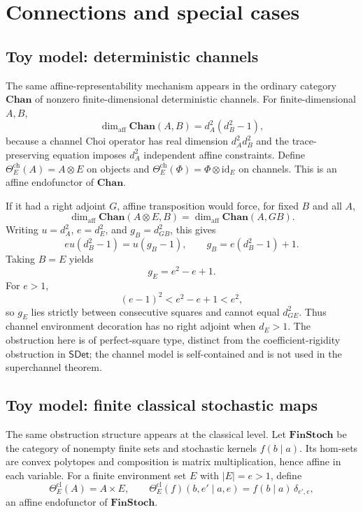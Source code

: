 \documentclass[11pt,a4paper]{article}
\theoremstyle{definition}
\theoremstyle{plain}
\theoremstyle{remark}
\newcommand{\affdim}{\dim_{\mathrm{aff}}}
\newcommand{\id}{\mathrm{id}}
\newcommand{\SDet}{\mathsf{SDet}}
\begin{document}
\section{Connections and special cases}

\subsection{Toy model: deterministic channels}

The same affine-representability mechanism appears in the ordinary
category $\mathbf{Chan}$ of nonzero finite-dimensional deterministic
channels. For finite-dimensional $A,B$,
\[
\affdim\mathbf{Chan}(A,B)=d_A^2(d_B^2-1),
\]
because a channel Choi operator has real dimension $d_A^2d_B^2$ and the
trace-preserving equation imposes $d_A^2$ independent affine constraints.
Define $\Theta_E^{\mathrm{ch}}(A)=A\otimes E$ on objects and
$\Theta_E^{\mathrm{ch}}(\Phi)=\Phi\otimes\id_E$ on channels. This is an
affine endofunctor of $\mathbf{Chan}$.

If it had a right adjoint $G$, affine transposition would force, for fixed
$B$ and all $A$,
\[
\affdim\mathbf{Chan}(A\otimes E,B)
=\affdim\mathbf{Chan}(A,GB).
\]
Writing $u=d_A^2$, $e=d_E^2$, and $g_B=d_{GB}^2$, this gives
\[
eu(d_B^2-1)=u(g_B-1),
\qquad g_B=e(d_B^2-1)+1.
\]
Taking $B=E$ yields
\[
g_E=e^2-e+1.
\]
For $e>1$,
\[
(e-1)^2<e^2-e+1<e^2,
\]
so $g_E$ lies strictly between consecutive squares and cannot equal
$d_{GE}^2$. Thus channel environment decoration has no right adjoint
when $d_E>1$. The obstruction here is of perfect-square type, distinct
from the coefficient-rigidity obstruction in $\SDet$; the channel model
is self-contained and is not used in the superchannel theorem.

\subsection{Toy model: finite classical stochastic maps}

The same obstruction structure appears at the classical level. Let
$\mathbf{FinStoch}$ be the category of nonempty finite sets and
stochastic kernels $f(b\mid a)$. Its hom-sets are convex polytopes and
composition is matrix multiplication, hence affine in each variable. For
a finite environment set $E$ with $|E|=e>1$, define
\[
\Theta_E^{\mathrm{cl}}(A)=A\times E,
\qquad
\Theta_E^{\mathrm{cl}}(f)(b,e'\mid a,e)=f(b\mid a)\,\delta_{e',e},
\]
an affine endofunctor of $\mathbf{FinStoch}$.
\end{document}
